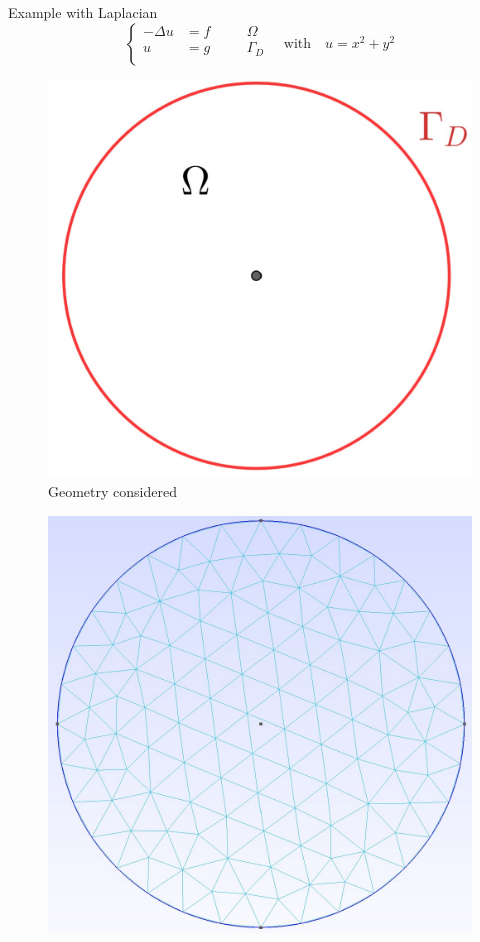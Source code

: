 \begin{frame}[allowframebreaks]{Example with Laplacian}
	$$\left\{\begin{aligned}
		-\Delta u &= f \quad&&\Omega \\
		u&=g \quad&&\Gamma_D \\
	\end{aligned}\right. \quad \text{with} \quad
	u=x^2+y^2$$
	\begin{minipage}{0.31\linewidth}
		\begin{figure}
			\includegraphics[width=\linewidth]{"images/parareal/circle.jpg"}
			\caption{Geometry considered}
		\end{figure}
	\end{minipage} \quad
	\begin{minipage}{0.31\linewidth}
		\begin{figure}
			\includegraphics[width=\linewidth]{"images/parareal/circle_mesh.jpg"}

\end{figure}
\end{minipage}
\end{frame}
